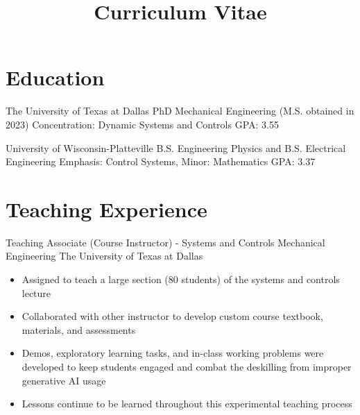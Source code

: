 \documentclass[11pt,letterpaper,roman]{moderncv} %
\title{Curriculum Vitae}
\begin{document}

\makecvtitle %

\vspace{- 1 cm}

\section{Education}

{The University of Texas at Dallas}
{PhD Mechanical Engineering (M.S. obtained in 2023)}{}
{Concentration: Dynamic Systems and Controls} 
{GPA: 3.55}

{University of Wisconsin-Platteville}
{B.S. Engineering Physics and  B.S. Electrical Engineering}{}
{Emphasis: Control Systems, Minor: Mathematics} 
{GPA: 3.37}




\section{Teaching Experience}
{Teaching Associate (Course Instructor) - Systems and Controls}
{Mechanical Engineering}
{The University of Texas at Dallas}{}
{\begin{itemize}
    \item Assigned to teach a large section (80 students) of the systems and controls lecture
    \item Collaborated with other instructor to develop custom course textbook, materials, and assessments
    \item Demos, exploratory learning tasks, and in-class working problems were developed to keep students engaged and combat the deskilling from improper generative AI usage
    \item Lessons continue to be learned throughout this experimental teaching process
\end{itemize}}
\end{document}

